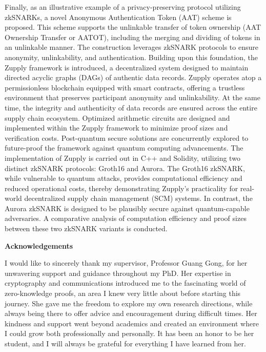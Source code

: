 Finally, as an illustrative example of a privacy-preserving protocol utilizing zkSNARKs, a novel Anonymous Authentication Token (AAT) scheme is proposed. This scheme supports the unlinkable transfer of token ownership (AAT Ownership Transfer or AATOT), including the merging and dividing of tokens in an unlinkable manner. The construction leverages zkSNARK protocols to ensure anonymity, unlinkability, and authentication. Building upon this foundation, the Zupply framework is introduced, a decentralized system designed to maintain directed acyclic graphs (DAGs) of authentic data records. Zupply operates atop a permissionless blockchain equipped with smart contracts, offering a trustless environment that preserves participant anonymity and unlinkability. At the same time, the integrity and authenticity of data records are ensured across the entire supply chain ecosystem. Optimized arithmetic circuits are designed and implemented within the Zupply framework to minimize proof sizes and verification costs. Post-quantum secure solutions are concurrently explored to future-proof the framework against quantum computing advancements. The implementation of Zupply is carried out in C++ and Solidity, utilizing two distinct zkSNARK protocols: Groth16 and Aurora. The Groth16 zkSNARK, while vulnerable to quantum attacks, provides computational efficiency and reduced operational costs, thereby demonstrating Zupply’s practicality for real-world decentralized supply chain management (SCM) systems. In contrast, the Aurora zkSNARK is designed to be plausibly secure against quantum-capable adversaries. A comparative analysis of computation efficiency and proof sizes between these two zkSNARK variants is conducted.






\cleardoublepage
{}    %

\begin{center}\textbf{Acknowledgements}\end{center}

I would like to sincerely thank my supervisor, Professor Guang Gong, for her unwavering support and guidance throughout my PhD. Her expertise in cryptography and communications introduced me to the fascinating world of zero-knowledge proofs, an area I knew very little about before starting this journey. She gave me the freedom to explore my own research directions, while always being there to offer advice and encouragement during difficult times. Her kindness and support went beyond academics and created an environment where I could grow both professionally and personally. It has been an honor to be her student, and I will always be grateful for everything I have learned from her.

